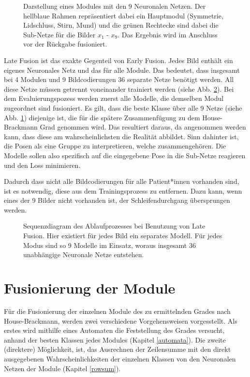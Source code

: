 \begin{figure}[b]
\begin{tikzpicture}[->,>=stealth',shorten >=1pt,auto,node distance=2.5cm,semithick]
\end{tikzpicture}
\caption[Darstellung eines Modules mit den 9 Neuronalen Netzen]{Darstellung eines Modules mit den 9 Neuronalen Netzen. Der hellblaue Rahmen repräsentiert dabei ein Hauptmodul (Symmetrie, Lidschluss, Stirn, Mund) und die grünen Rechtecke sind dabei die Sub-Netze für die Bilder $x_1$ - $x_9$. Das Ergebnis wird im Anschluss vor der Rückgabe fusioniert.}\label{cap:mod_lf}
\end{figure}\label{fig:mod_lf}


Late Fusion ist das exakte Gegenteil von Early Fusion. Jedes Bild enthält ein eigenes Neuronales Netz und das für alle Module. Das bedeutet, dass insgesamt bei 4 Modulen und 9 Bildcodierungen 36 separate Netze benötigt werden. All diese Netze müssen getrennt voneinander trainiert werden (siehe Abb. \ref{cap:late}). Bei dem Evaluierungspozess werden zuerst alle Modelle, die demselben Modul zugeordnet sind fusioniert. Es gilt, dass die beste Klasse über alle 9 Netze (siehe Abb. \ref{cap:mod_lf}) diejenige ist, die für die spätere Zusammenfügung zu dem House-Brackmann Grad genommen wird. Das resultiert daraus, da angenommen werden kann, dass diese am wahrscheinlichsten die Realität abbildet. Sinn dahinter ist, die Posen als eine Gruppe zu interpretieren, welche zusammengehören. Die Modelle sollen also spezifisch auf die eingegebene Pose in die Sub-Netze reagieren und den Loss minimieren.

Dadurch dass nicht alle Bildcodierungen für alle Patient*innen vorhanden sind, ist es notwendig, diese aus dem Trainingsprozess zu entfernen. Dazu kann, wenn eines der 9 Bilder nicht vorhanden ist, der Schleifendurchgang übersprungen werden.



\begin{figure}[!t]\centering
\makebox[0pt]{}
\caption[Sequenzdiagram des Ablaufprozesses bei Benutzung von Late Fusion]{Sequenzdiagram des Ablaufprozesses bei Benutzung von Late Fusion. Hier existiert für jedes Bild ein separates Modell. Für jedes Modus sind so 9 Modelle im Einsatz, woraus insgesamt 36 unabhängige Neuronale Netze entstehen.}\label{cap:late}
\end{figure}\label{fig:late}





\clearpage
\section{Fusionierung der Module}\label{fusion}
Für die Fusionierung der einzelnen Module des zu ermittelnden Grades nach House-Brackmann, werden zwei verschiedene Vorgehensweisen vorgesstellt. Als erstes wird mithilfe eines Automaten die Feststellung des Grades versucht, anhand der besten Klassen jedes Modules (Kapitel \ref{automata}). Die zweite (direktere) Möglichkeit, ist, das Ausrechnen der Zeilensumme mit den direkt ausgegebenen Wahrscheinlichkeiten der einzelnen Klassen von den Neuronalen Netzen der Module (Kapitel \ref{rowsum}).


